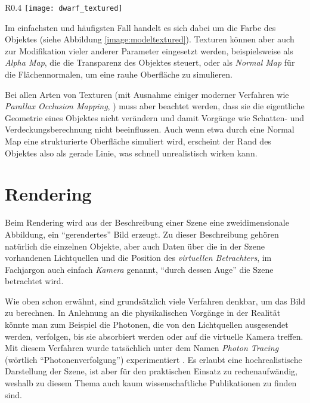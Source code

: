 \begin{wrapfigure}{R}{0.4\textwidth}
  \texttt{[image: dwarf\_textured]}
  \vspace{-10pt}
  \caption{Diffuse Textur kombiniert mit Gouraud Shading.}
  \label{image:modeltextured}
\end{wrapfigure}

Im einfachsten und häufigsten Fall handelt es sich dabei um die Farbe des Objektes (siehe Abbildung \ref{image:modeltextured}). Texturen können aber auch zur Modifikation vieler anderer Parameter eingesetzt werden, beispielsweise als \emph{Alpha Map}, die die Transparenz des Objektes steuert, oder als \emph{Normal Map} für die Flächennormalen, um eine rauhe Oberfläche zu simulieren.

Bei allen Arten von Texturen (mit Ausnahme einiger moderner Verfahren wie \emph{Parallax Occlusion Mapping}, ) muss aber beachtet werden, dass sie die eigentliche Geometrie eines Objektes nicht verändern und damit Vorgänge wie Schatten- und Verdeckungsberechnung nicht beeinflussen. Auch wenn etwa durch eine Normal Map eine strukturierte Oberfläche simuliert wird, erscheint der Rand des Objektes also als gerade Linie, was schnell unrealistisch wirken kann.

\section{Rendering}
\label{rendering}
Beim Rendering wird aus der Beschreibung einer Szene eine zweidimensionale Abbildung, ein \enquote{gerendertes} Bild erzeugt. Zu dieser Beschreibung gehören natürlich die einzelnen Objekte, aber auch Daten über die in der Szene vorhandenen Lichtquellen und die Position des \emph{virtuellen Betrachters}, im Fachjargon auch einfach \emph{Kamera} genannt, \enquote{durch dessen Auge} die Szene betrachtet wird.

Wie oben schon erwähnt, sind grundsätzlich viele Verfahren denkbar, um das Bild zu berechnen. In Anlehnung an die physikalischen Vorgänge in der Realität könnte man zum Beispiel die Photonen, die von den Lichtquellen ausgesendet werden, verfolgen, bis sie absorbiert werden oder auf die virtuelle Kamera treffen. Mit diesem Verfahren wurde tatsächlich unter dem Namen \emph{Photon Tracing} (wörtlich \enquote{Photonenverfolgung}) experimentiert . Es erlaubt eine hochrealistische Darstellung der Szene, ist aber für den praktischen Einsatz zu rechenaufwändig, weshalb zu diesem Thema auch kaum wissenschaftliche Publikationen zu finden sind.


